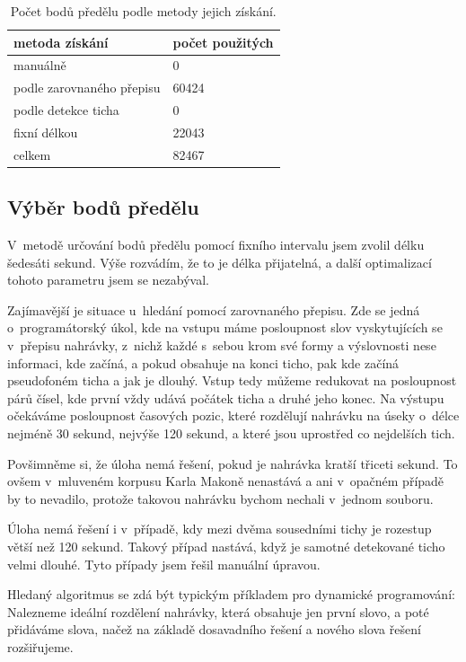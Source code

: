 \begin{table}[htpb]
\begin{center}
\begin{tabular}{|l|l|}
\hline
metoda získání & počet použitých \\
\hline
manuálně & 0 \\
podle zarovnaného přepisu & 60424 \\
podle detekce ticha & 0 \\
fixní délkou & 22043 \\
celkem & 82467 \\
\hline
\end{tabular}
\caption{Počet bodů předělu podle metody jejich získání.}\label{tab:splitpoints}
\end{center}
\end{table}

\subsection{Výběr bodů předělu}

V~metodě určování bodů předělu pomocí fixního intervalu jsem zvolil délku
šedesáti sekund. Výše rozvádím, že to je délka přijatelná, a další
optimalizací tohoto parametru jsem se nezabýval.

Zajímavější je situace u~hledání pomocí zarovnaného přepisu. Zde se jedná
o~programátorský úkol, kde na vstupu máme posloupnost slov vyskytujících se
v~přepisu nahrávky, z~nichž každé s~sebou krom své formy a výslovnosti nese
informaci, kde začíná, a pokud obsahuje na konci ticho, pak kde začíná
pseudofoném ticha a jak je dlouhý. Vstup tedy můžeme redukovat na posloupnost
párů čísel, kde první vždy udává počátek ticha a druhé jeho konec. Na výstupu
očekáváme posloupnost časových pozic, které rozdělují nahrávku na úseky o~délce
nejméně 30 sekund, nejvýše 120 sekund, a které jsou uprostřed co nejdelších
tich.

Povšimněme si, že úloha nemá řešení, pokud je nahrávka kratší třiceti sekund. To
ovšem v~mluveném korpusu Karla Makoně nenastává a ani v~opačném případě by to nevadilo,
protože takovou nahrávku bychom nechali v~jednom souboru.

Úloha nemá řešení i v~případě, kdy mezi dvěma sousedními tichy
je rozestup větší než 120 sekund. Takový případ nastává, když je samotné
detekované ticho velmi dlouhé. Tyto případy jsem řešil manuální úpravou.

Hledaný algoritmus se zdá být typickým příkladem pro dynamické programování:
Nalezneme ideální rozdělení nahrávky, která obsahuje jen první slovo, a poté
přidáváme slova, načež na základě dosavadního řešení a nového slova řešení
rozšiřujeme.

